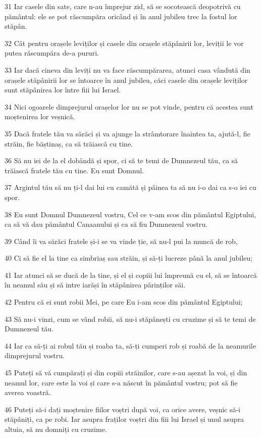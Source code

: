 \par 31 Iar casele din sate, care n-au împrejur zid, să se socotească deopotrivă cu pământul: ele se pot răscumpăra oricând și în anul jubileu trec la fostul lor stăpân.
\par 32 Cât pentru orașele leviților și casele din orașele stăpânirii lor, leviții le vor putea răscumpăra de-a pururi.
\par 33 Iar dacă cineva din leviți nu va face răscumpărarea, atunci casa vândută din orașele stăpânirii lor se întoarce în anul jubileu, căci casele din orașele leviților sunt stăpânirea lor între fiii lui Israel.
\par 34 Nici ogoarele dimprejurul orașelor lor nu se pot vinde, pentru că acestea sunt moștenirea lor veșnică.
\par 35 Dacă fratele tău va sărăci și va ajunge la strâmtorare înaintea ta, ajută-l, fie străin, fie băștinaș, ca să trăiască cu tine.
\par 36 Să nu iei de la el dobândă și spor, ci să te temi de Dumnezeul tău, ca să trăiască fratele tău cu tine. Eu sunt Domnul.
\par 37 Argintul tău să nu ți-l dai lui cu camătă și pâinea ta să nu i-o dai ca s-o iei cu spor.
\par 38 Eu sunt Domnul Dumnezeul vostru, Cel ce v-am scos din pământul Egiptului, ca să vă dau pământul Canaanului și ca să fiu Dumnezeul vostru.
\par 39 Când îi va sărăci fratele și-i se va vinde ție, să nu-l pui la muncă de rob,
\par 40 Ci să fie el la tine ca simbriaș sau străin, și să-ți lucreze până la anul jubileu;
\par 41 Iar atunci să se ducă de la tine, și el și copiii lui împreună cu el, să se întoarcă în neamul său și să intre iarăși în stăpânirea părinților săi.
\par 42 Pentru că ei sunt robii Mei, pe care Eu i-am scos din pământul Egiptului;
\par 43 Să nu-i vinzi, cum se vând robii, să nu-i stăpânești cu cruzime și să te temi de Dumnezeul tău.
\par 44 Iar ca să-ți ai robul tău și roaba ta, să-ți cumperi rob și roabă de la neamurile dimprejurul vostru.
\par 45 Puteți să vă cumpărați și din copiii străinilor, care s-au așezat la voi, și din neamul lor, care este la voi și care s-a născut în pământul vostru; pot să fie averea voastră.
\par 46 Puteți să-i dați moștenire fiilor voștri după voi, ca orice avere, veșnic să-i stăpâniți, ca pe robi. Iar asupra fraților voștri din fiii lui Israel și unul asupra altuia, să nu domniți cu cruzime.
